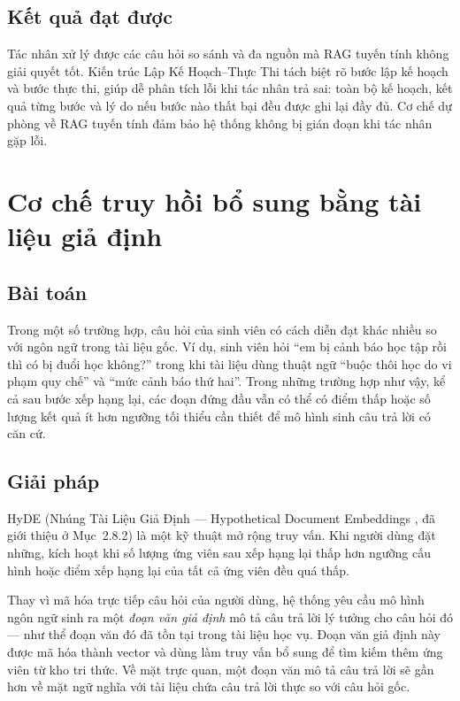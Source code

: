 \documentclass[../DoAn.tex]{subfiles}
\begin{document}
\subsection{Kết quả đạt được}

Tác nhân xử lý được các câu hỏi so sánh và đa nguồn mà RAG tuyến tính không
giải quyết tốt. Kiến trúc Lập Kế Hoạch--Thực Thi tách biệt rõ bước lập kế
hoạch và bước thực thi, giúp dễ phân tích lỗi khi tác nhân trả sai: toàn bộ
kế hoạch, kết quả từng bước và lý do nếu bước nào thất bại đều được ghi lại đầy
đủ. Cơ chế dự phòng về RAG tuyến tính đảm bảo hệ thống không bị gián đoạn khi
tác nhân gặp lỗi.

\section{Cơ chế truy hồi bổ sung bằng tài liệu giả định}
\label{sec:ch5-hyde}

\subsection{Bài toán}

Trong một số trường hợp, câu hỏi của sinh viên có cách diễn đạt khác nhiều so
với ngôn ngữ trong tài liệu gốc. Ví dụ, sinh viên hỏi ``em bị cảnh báo học tập
rồi thì có bị đuổi học không?'' trong khi tài liệu dùng thuật ngữ ``buộc thôi
học do vi phạm quy chế'' và ``mức cảnh báo thứ hai''. Trong những trường hợp
như vậy, kể cả sau bước xếp hạng lại, các đoạn đứng đầu vẫn có thể có điểm
thấp hoặc số lượng kết quả ít hơn ngưỡng tối thiểu cần thiết để mô hình sinh
câu trả lời có căn cứ.

\subsection{Giải pháp}

HyDE (Nhúng Tài Liệu Giả Định --- Hypothetical Document Embeddings \cite{hyde2022}, đã giới
thiệu ở Mục~2.8.2) là một kỹ thuật mở rộng truy vấn. Khi người dùng đặt những, kích hoạt khi số lượng
ứng viên sau xếp hạng lại thấp hơn ngưỡng cấu hình hoặc điểm xếp hạng lại của
tất cả ứng viên đều quá thấp.

Thay vì mã hóa trực tiếp câu hỏi của người dùng, hệ thống yêu cầu mô hình ngôn
ngữ sinh ra một \textit{đoạn văn giả định} mô tả câu trả lời lý tưởng cho câu
hỏi đó --- như thể đoạn văn đó đã tồn tại trong tài liệu học vụ. Đoạn văn giả
định này được mã hóa thành vector và dùng làm truy vấn bổ sung để tìm kiếm thêm
ứng viên từ kho tri thức. Về mặt trực quan, một đoạn văn mô tả câu trả lời sẽ
gần hơn về mặt ngữ nghĩa với tài liệu chứa câu trả lời thực so với câu hỏi gốc.
\end{document}
